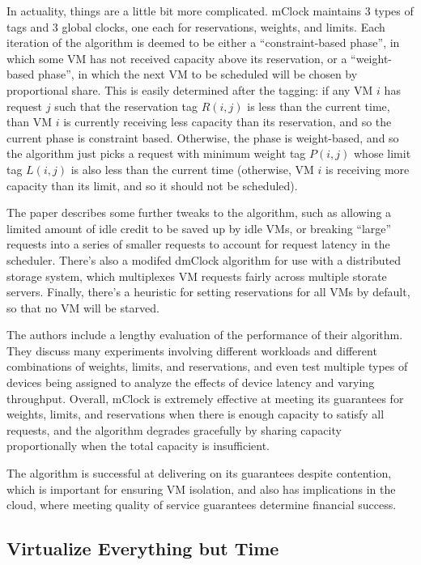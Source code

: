 \documentclass[letterpaper, twocolumn]{article}
\begin{document}
In actuality, things are a little bit more complicated.  mClock maintains
3 types of tags and 3 global clocks, one each for reservations, weights,
and limits.  Each iteration of the algorithm is deemed to be
either a ``constraint-based phase'', in which some VM has not received
capacity above its reservation, or a ``weight-based phase'', in which the
next VM to be scheduled will be chosen by proportional share.  This is easily
determined after the tagging:  if any VM $i$ has request $j$ such that the
reservation tag $R(i, j)$ is less than the current time, than VM $i$ is currently
receiving less capacity than its reservation, and so the current phase is
constraint based.  Otherwise, the phase is weight-based, and so the algorithm
just picks a request with minimum weight tag $P(i, j)$ whose limit tag
$L(i, j)$ is also less than the current time (otherwise, VM $i$ is receiving
more capacity than its limit, and so it should not be scheduled).

The paper describes some further tweaks to the algorithm, such as allowing
a limited amount of idle credit to be saved up by idle VMs, or breaking ``large''
requests into a series of smaller requests to account for request latency
in the scheduler.  There's also a modifed dmClock algorithm for use with
a distributed storage system, which multiplexes VM requests fairly across multiple
storate servers.  Finally, there's a heuristic for setting reservations for
all VMs by default, so that no VM will be starved.

The authors include a lengthy evaluation of the performance of their algorithm.
They discuss many experiments involving different workloads and different combinations
of weights, limits, and reservations, and even test multiple types of devices
being assigned to analyze the effects of device latency and varying throughput.
Overall, mClock is extremely effective at meeting its guarantees for weights, limits,
and reservations when there is enough capacity to satisfy all requests, and
the algorithm degrades gracefully by sharing capacity proportionally when
the total capacity is insufficient.

The algorithm is successful at delivering on its guarantees despite contention,
which is important for ensuring VM isolation, and also has implications in the cloud,
where meeting quality of service guarantees determine financial success.

\subsection{Virtualize Everything but Time}
\label{sec:summaries/time}
\end{document}
